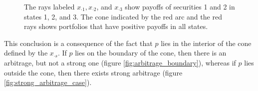 \documentclass[\topdir/lecture\_notes.tex]{subfiles}
\begin{document}
\begin{figure}
    \begin{center}
    \end{center}
    \caption{The rays labeled $x_{\cdot 1}, x_{\cdot 2}$, and $x_{\cdot 3}$ show payoffs of securities 1 and 2 in states 1, 2, and 3. The cone indicated by the red arc and the red rays shows portfolios that have positive payoffs in all states.}
    \label{fig:positive_payoff_cone}
\end{figure}

 
This conclusion is a consequence of the fact that $p$ lies in the interior of the cone defined by the $x_{\cdot s}$. If $p$ lies on the boundary of the cone, then there is an arbitrage, but not a strong one (figure \ref{fig:arbitrage_boundary}), whereas if $p$ lies outside the cone, then there exists strong arbitrage (figure \ref{fig:strong_arbitrage_case}).
\end{document}
